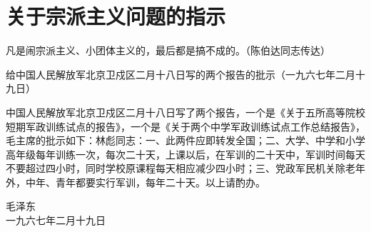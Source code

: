 \section[关于宗派主义问题的指示（一九六七年二月）]{关于宗派主义问题的指示}


凡是闹宗派主义、小团体主义的，最后都是搞不成的。（陈伯达同志传达）

给中国人民解放军北京卫戍区二月十八日写的两个报告的批示（一九六七年二月十九日）

中国人民解放军北京卫戍区二月十八日写了两个报告，一个是《关于五所高等院校短期军政训练试点的报告》，一个是《关于两个中学军政训练试点工作总结报告》，毛主席的批示如下：林彪同志：一、此两件应即转发全国；二、大学、中学和小学高年级每年训练一次，每次二十天，上课以后，在军训的二十天中，军训时间每天不要超过四小时，同时学校原课程每天相应减少四小时；三、党政军民机关除老年外，中年、青年都要实行军训，每年二十天。以上请酌办。

{\raggedleft 毛泽东\\一九六七年二月十九日\par}


